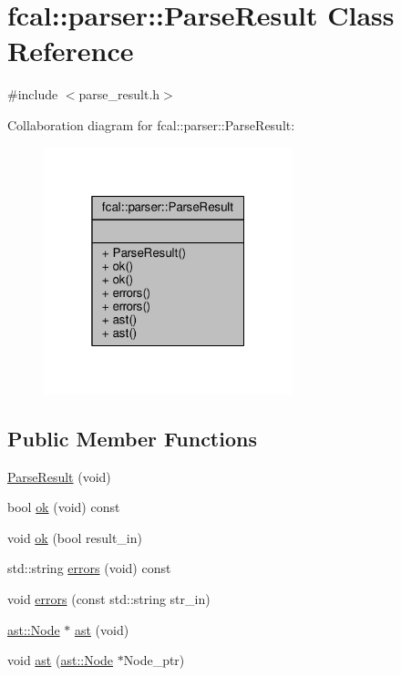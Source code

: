 \hypertarget{classfcal_1_1parser_1_1ParseResult}{}\section{fcal\+:\+:parser\+:\+:Parse\+Result Class Reference}
\label{classfcal_1_1parser_1_1ParseResult}


{\ttfamily \#include $<$parse\+\_\+result.\+h$>$}



Collaboration diagram for fcal\+:\+:parser\+:\+:Parse\+Result\+:
\nopagebreak
\begin{figure}[H]
\begin{center}
\leavevmode
\includegraphics[width=205pt]{classfcal_1_1parser_1_1ParseResult__coll__graph}
\end{center}
\end{figure}
\subsection*{Public Member Functions}
\begin{DoxyCompactItemize}
\item 
\hyperlink{classfcal_1_1parser_1_1ParseResult_a1372ccc11f19a387c5058b54164daaee}{Parse\+Result} (void)
\item 
bool \hyperlink{classfcal_1_1parser_1_1ParseResult_a0535504e6c25d9d057f65a03e0b96165}{ok} (void) const 
\item 
void \hyperlink{classfcal_1_1parser_1_1ParseResult_a8410b518007948a5fbbb3a1c31cbcfea}{ok} (bool result\+\_\+in)
\item 
std\+::string \hyperlink{classfcal_1_1parser_1_1ParseResult_ae7f69b63116bef2d5ff11b837d3364a5}{errors} (void) const 
\item 
void \hyperlink{classfcal_1_1parser_1_1ParseResult_a317be0716c4fa1a1a318218d6949936a}{errors} (const std\+::string str\+\_\+in)
\item 
\hyperlink{classfcal_1_1ast_1_1Node}{ast\+::\+Node} $\ast$ \hyperlink{classfcal_1_1parser_1_1ParseResult_a5c9d3ab206f3b16ea636a65fff7f43a7}{ast} (void)
\item 
void \hyperlink{classfcal_1_1parser_1_1ParseResult_ac1129c7e0da4be321a204f9d3975f480}{ast} (\hyperlink{classfcal_1_1ast_1_1Node}{ast\+::\+Node} $\ast$Node\+\_\+ptr)
\end{DoxyCompactItemize}


